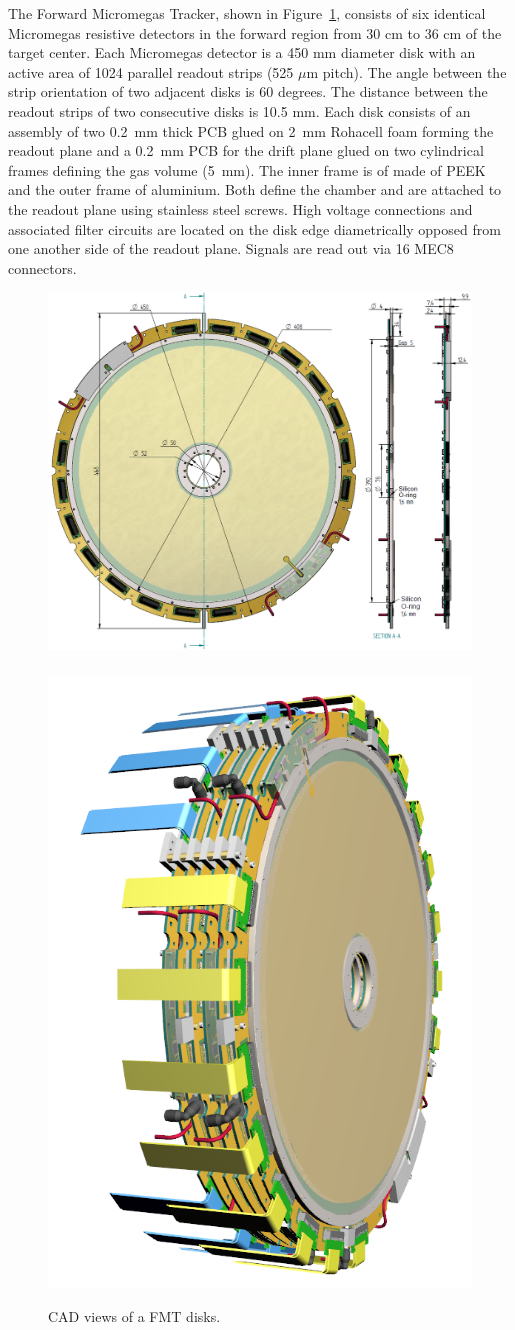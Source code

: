 The Forward Micromegas Tracker, shown in Figure~\ref{fig:mm-fig5}, consists of six identical Micromegas resistive detectors in the forward region from 30 cm to 36 cm of the target center. Each Micromegas detector is a 450 mm diameter disk with an active area of 1024 parallel readout strips (525 $\mu$m pitch). The angle between the strip orientation of two adjacent disks is 60 degrees. The distance between the readout strips of two consecutive disks is 10.5 mm.  Each disk consists of an assembly of two 0.2~mm thick PCB glued on 2~mm Rohacell foam forming the readout plane and a 0.2~mm PCB for the drift plane glued on two cylindrical frames defining the gas volume (5~mm). The inner frame is of made of PEEK and the outer frame of aluminium. Both define the chamber and are attached to the readout plane using stainless steel screws. High voltage connections and associated filter circuits are located on the disk edge diametrically opposed from one another side of the readout plane.
Signals are read out via 16 MEC8 connectors. 

\begin{figure}[htb]
 
\includegraphics[width=0.66\columnwidth,keepaspectratio]{images/fig6_1}~\includegraphics[width=0.33\columnwidth,
keepaspectratio]{images/fig6_2}
 \caption{CAD views of a FMT disks.}
 \label{fig:mm-fig5}
\end{figure}

